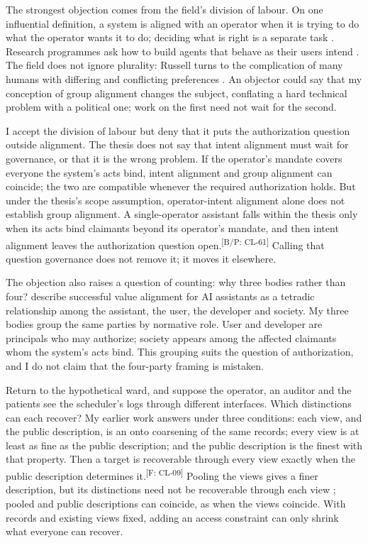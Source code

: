 \documentclass[pdflatex,sn-basic]{sn-jnl}%
\newcommand{\slot}[1]{}%
\newcommand{\claim}[2]{\ifannotated\textsuperscript{\textcolor{blue!60!black}{\tiny[#1: #2]}}\fi}
\newcommand{\Selfcite}[1]{\ifanonymous\citet{#1}\else My earlier work \citep{#1}\fi}
\begin{document}
\slot{3.3}
The strongest objection comes from the field's division of labour. On one influential definition, a system is aligned with an operator when it is trying to do what the operator wants it to do; deciding what is right is a separate task \citep{christiano2018clarifying}. Research programmes ask how to build agents that behave as their users intend \citep{leike2018}. The field does not ignore plurality: Russell turns to the complication of many humans with differing and conflicting preferences \citep[ch.~9]{russell2019}. An objector could say that my conception of group alignment changes the subject, conflating a hard technical problem with a political one; work on the first need not wait for the second.

I accept the division of labour but deny that it puts the authorization question outside alignment. The thesis does not say that intent alignment must wait for governance, or that it is the wrong problem. If the operator's mandate covers everyone the system's acts bind, intent alignment and group alignment can coincide; the two are compatible whenever the required authorization holds. But under the thesis's scope assumption, operator-intent alignment alone does not establish group alignment. A single-operator assistant falls within the thesis only when its acts bind claimants beyond its operator's mandate, and then intent alignment leaves the authorization question open.\claim{B/P}{CL-61} Calling that question governance does not remove it; it moves it elsewhere.

The objection also raises a question of counting: why three bodies rather than four? \citet[ch.~5]{gabriel2024assistants} describe successful value alignment for AI assistants as a tetradic relationship among the assistant, the user, the developer and society. My three bodies group the same parties by normative role. User and developer are principals who may authorize; society appears among the affected claimants whom the system's acts bind. This grouping suits the question of authorization, and I do not claim that the four-party framing is mistaken.

\slot{3.4}
Return to the hypothetical ward, and suppose the operator, an auditor and the patients see the scheduler's logs through different interfaces. Which distinctions can each recover? \Selfcite{tsiokos2026f4} answers under three conditions: each view, and the public description, is an onto coarsening of the same records; every view is at least as fine as the public description; and the public description is the finest with that property. Then a target is recoverable through every view exactly when the public description determines it.\claim{F}{CL-09} Pooling the views gives a finer description, but its distinctions need not be recoverable through each view \citep{tsiokos2026f8}; pooled and public descriptions can coincide, as when the views coincide. With records and existing views fixed, adding an access constraint can only shrink what everyone can recover.
\end{document}
